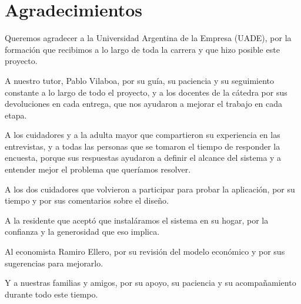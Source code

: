 \chapter*{Agradecimientos}

Queremos agradecer a la Universidad Argentina de la Empresa (UADE), por la formación que recibimos a lo largo de toda la carrera y que hizo posible este proyecto.

A nuestro tutor, Pablo Vilaboa, por su guía, su paciencia y su seguimiento constante a lo largo de todo el proyecto, y a los docentes de la cátedra por sus devoluciones en cada entrega, que nos ayudaron a mejorar el trabajo en cada etapa.

A los cuidadores y a la adulta mayor que compartieron su experiencia en las entrevistas, y a todas las personas que se tomaron el tiempo de responder la encuesta, porque sus respuestas ayudaron a definir el alcance del sistema y a entender mejor el problema que queríamos resolver.

A los dos cuidadores que volvieron a participar para probar la aplicación, por su tiempo y por sus comentarios sobre el diseño.

A la residente que aceptó que instaláramos el sistema en su hogar, por la confianza y la generosidad que eso implica.

Al economista Ramiro Ellero, por su revisión del modelo económico y por sus sugerencias para mejorarlo.

Y a nuestras familias y amigos, por su apoyo, su paciencia y su acompañamiento durante todo este tiempo.
